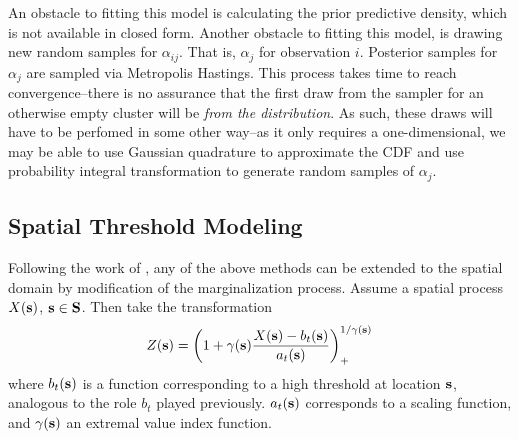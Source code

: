 An obstacle to fitting this model is calculating the prior predictive density,
  which is not available in closed form.  Another obstacle to fitting this
  model, is drawing new random samples for $\alpha_{ij}$.  That is, $\alpha_j$
  for observation $i$.  Posterior samples for $\alpha_j$ are sampled via
  Metropolis Hastings.  This process takes time to reach convergence--there is
  no assurance that the first draw from the sampler for an otherwise empty
  cluster will be \emph{from the distribution}.  As such, these draws will have
  to be perfomed in some other way--as it only requires a one-dimensional,
  we may be able to use Gaussian quadrature to approximate the CDF and use
  probability integral transformation to generate random samples of $\alpha_j$.

\subsection{Spatial Threshold Modeling}
Following the work of \cite{ferreira2014}, any of the above methods can be
extended to the spatial domain by modification of the marginalization process.
Assume a spatial process $X({\bf s})$, ${\bf s}\in {\bf S}$.  Then take the
transformation
\begin{equation}
  \label{eqn:spatial}
  Z({\bf s}) = \left(1 + \gamma({\bf s})\frac{X({\bf s}) - b_t({\bf s})}{a_t({\bf s})}\right)_{+}^{1/{\gamma({\bf s})}}
\end{equation}
where $b_t({\bf s})$ is a function corresponding to a high threshold at location
${\bf s}$, analogous to the role $b_t$ played previously. $a_t({\bf s})$
corresponds to a scaling function, and $\gamma({\bf s})$ an extremal value index
 function.







